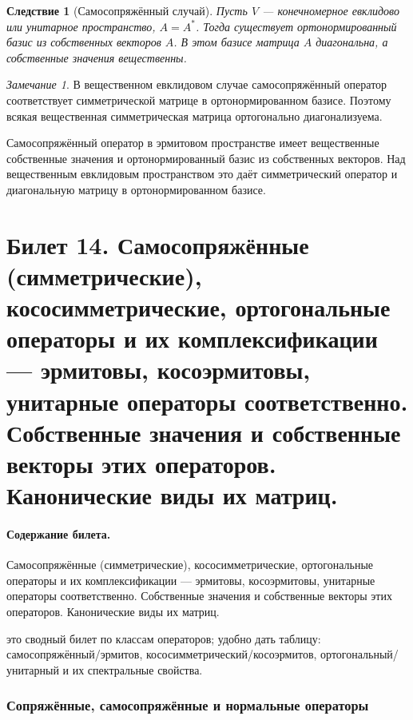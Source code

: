 \documentclass[12pt,a4paper]{article}
\theoremstyle{definition}
\theoremstyle{plain}
\newtheorem{corollary}[definition]{Следствие}
\theoremstyle{remark}
\newtheorem{remark}[definition]{Замечание}
\newenvironment{planadd}{\begin{planbox}}{\end{planbox}}
\newenvironment{knowledgefix}{\begin{clarifybox}}{\end{clarifybox}}
\begin{document}
\begin{corollary}[Самосопряжённый случай]
Пусть $V$ --- конечномерное евклидово или унитарное пространство, $A=A^*$.
Тогда существует ортонормированный базис из собственных векторов $A$.
В этом базисе матрица $A$ диагональна, а собственные значения вещественны.
\end{corollary}

\begin{remark}
В вещественном евклидовом случае самосопряжённый оператор соответствует симметрической матрице в ортонормированном базисе.
Поэтому всякая вещественная симметрическая матрица ортогонально диагонализуема.
\begin{knowledgefix}
Самосопряжённый оператор в эрмитовом пространстве имеет вещественные собственные значения и ортонормированный базис из собственных векторов. Над вещественным евклидовым пространством это даёт симметрический оператор и диагональную матрицу в ортонормированном базисе.
\end{knowledgefix}
\end{remark}

\clearpage

\section{Билет 14. Самосопряжённые (симметрические), кососимметрические, ортогональные операторы и их комплексификации — эрмитовы, косоэрмитовы, унитарные операторы соответственно. Собственные значения и собственные векторы этих операторов. Канонические виды их матриц.}

\paragraph{Содержание билета.} Самосопряжённые (симметрические), кососимметрические, ортогональные операторы и их комплексификации — эрмитовы, косоэрмитовы, унитарные операторы соответственно. Собственные значения и собственные векторы этих операторов. Канонические виды их матриц.

\begin{planadd}

это сводный билет по классам операторов; удобно дать таблицу: самосопряжённый/эрмитов, кососимметрический/косоэрмитов, ортогональный/унитарный и их спектральные свойства.

\end{planadd}

\subsubsection{Сопряжённые, самосопряжённые и нормальные операторы}
\end{document}
